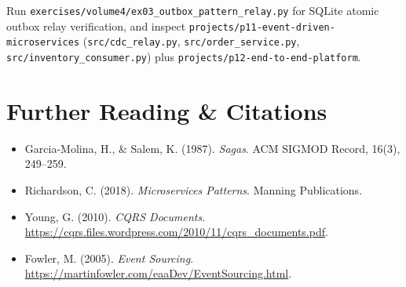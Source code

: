\begin{labbridgebox}
Run \texttt{exercises/volume4/ex03\_outbox\_pattern\_relay.py} for SQLite atomic outbox relay verification, and inspect \texttt{projects/p11-event-driven-microservices} (\texttt{src/cdc\_relay.py}, \texttt{src/order\_service.py}, \texttt{src/inventory\_consumer.py}) plus \texttt{projects/p12-end-to-end-platform}.
\end{labbridgebox}

\section{Further Reading \protect\& Citations}
\begin{itemize}[leftmargin=18pt]
  \item Garcia-Molina, H., \& Salem, K. (1987). \emph{Sagas}. ACM SIGMOD Record, 16(3), 249--259.
  \item Richardson, C. (2018). \emph{Microservices Patterns}. Manning Publications.
  \item Young, G. (2010). \emph{CQRS Documents}. \url{https://cqrs.files.wordpress.com/2010/11/cqrs_documents.pdf}.
  \item Fowler, M. (2005). \emph{Event Sourcing}. \url{https://martinfowler.com/eaaDev/EventSourcing.html}.
\end{itemize}
